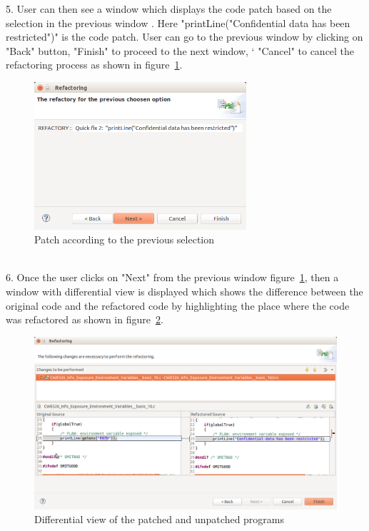 5. User can then see a window which displays the code patch based on the selection in the previous
window . Here "printLine("Confidential data has been restricted")" is the code patch. User can go 
to the previous window by clicking on "Back" button, "Finish" to proceed to the next window, `
"Cancel" to cancel the refactoring process as shown in figure~\ref{fig:tool5}.\\
\begin{figure}[!htb]
\centering
\includegraphics[width=0.7\textwidth]{png/Tool5.png}
\caption{Patch according to the previous selection}
\label{fig:tool5}
\end{figure}\\
6. Once the user clicks on "Next" from the previous window figure~\ref{fig:tool5}, then a 
window with differential view is displayed which shows the difference between the original code
and the refactored code by highlighting the place where the code was refactored as shown in figure~\ref{fig:tool6}.\\
\begin{figure}[!htb]
\centering
\includegraphics[width=1.0\textwidth]{png/Tool6.png}
\caption{Differential view of the patched and unpatched programs}
\label{fig:tool6}
\end{figure}\\
 
